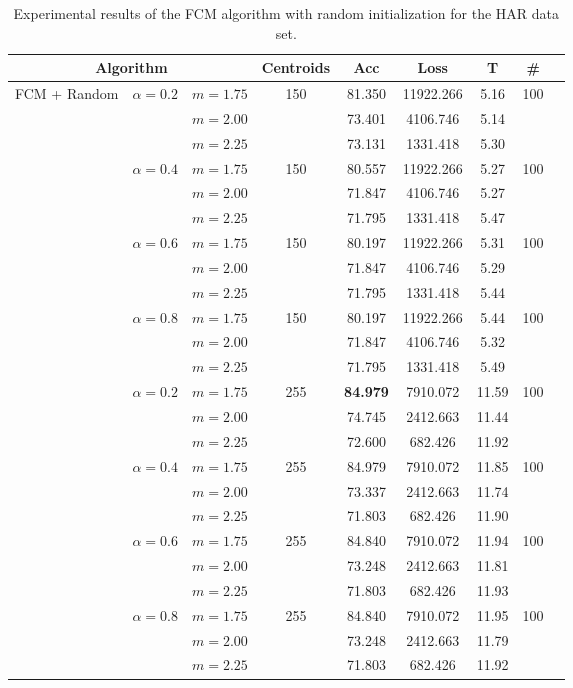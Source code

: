 \begin{table}[h!]
  \centering
\caption{Experimental results of the FCM algorithm with random initialization for the HAR data set.}
\label{tab:har2}
\begin{tabular}{ccccccccc}
\toprule
\multicolumn{3}{c}{Algorithm} & Centroids & Acc & Loss & T & \# \\ \midrule
\multirow{24}{*}{FCM + Random} & \multirow{3}{*}{$\alpha = 0.2$} & $m=1.75$ & \multirow{3}{*}{150} & 81.350 & 11922.266 & 5.16 & \multirow{3}{*}{100} \\
 &  & $m=2.00$ &  & 73.401 & 4106.746 & 5.14 &\\
 &  & $m=2.25$ &  & 73.131 & 1331.418 & 5.30 &\\ \cline{2-8}
 & \multirow{3}{*}{$\alpha = 0.4$} & $m=1.75$ & \multirow{3}{*}{150} & 80.557 & 11922.266 & 5.27 &\multirow{3}{*}{100}\\
 &  & $m=2.00$ &  & 71.847 & 4106.746 & 5.27 &\\
 &  & $m=2.25$ &  & 71.795 & 1331.418 & 5.47 &\\ \cline{2-8}
 & \multirow{3}{*}{$\alpha = 0.6$} & $m=1.75$ & \multirow{3}{*}{150} & 80.197 & 11922.266 & 5.31 &\multirow{3}{*}{100}\\
 &  & $m=2.00$ &  & 71.847 & 4106.746 & 5.29 &\\
 &  & $m=2.25$ &  & 71.795 & 1331.418 & 5.44 &\\ \cline{2-8}
 & \multirow{3}{*}{$\alpha = 0.8$} & $m=1.75$ & \multirow{3}{*}{150} & 80.197 & 11922.266 & 5.44 &\multirow{3}{*}{100}\\
 &  & $m=2.00$ &  & 71.847 & 4106.746 & 5.32 &\\
 &  & $m=2.25$ &  & 71.795 & 1331.418 & 5.49 &\\ \cline{2-8}
 & \multirow{3}{*}{$\alpha = 0.2$} & $m=1.75$ & \multirow{3}{*}{255} & \textbf{84.979} & 7910.072 & 11.59 &\multirow{3}{*}{100}\\
 &  & $m=2.00$ &  & 74.745 & 2412.663 & 11.44 &\\
 &  & $m=2.25$ &  & 72.600 & 682.426 & 11.92 &\\ \cline{2-8}
 & \multirow{3}{*}{$\alpha = 0.4$} & $m=1.75$ & \multirow{3}{*}{255} & 84.979 & 7910.072 & 11.85 &\multirow{3}{*}{100}\\
 &  & $m=2.00$ &  & 73.337 & 2412.663 & 11.74 &\\
 &  & $m=2.25$ &  & 71.803 & 682.426 & 11.90 &\\\cline{2-8}
 & \multirow{3}{*}{$\alpha = 0.6$} & $m=1.75$ & \multirow{3}{*}{255} & 84.840 & 7910.072 & 11.94 &\multirow{3}{*}{100}\\
 &  & $m=2.00$ &  & 73.248 & 2412.663 & 11.81 &\\
 &  & $m=2.25$ &  & 71.803 & 682.426 & 11.93 &\\\cline{2-8}
 & \multirow{3}{*}{$\alpha = 0.8$} & $m=1.75$ & \multirow{3}{*}{255} & 84.840 & 7910.072 & 11.95 &\multirow{3}{*}{100}\\
 &  & $m=2.00$ &  & 73.248 & 2412.663 & 11.79 &\\
 &  & $m=2.25$ &  & 71.803 & 682.426 & 11.92 &\\ \bottomrule
\end{tabular}
\end{table}

